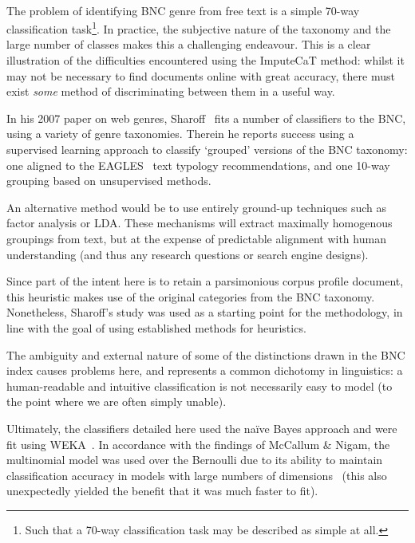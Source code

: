 
\paragraph{}
The problem of identifying BNC genre from free text is a simple 70-way classification task\footnote{Such that a 70-way classification task may be described as simple at all.}.  In practice, the subjective nature of the taxonomy and the large number of classes makes this a challenging endeavour.  This is a clear illustration of the difficulties encountered using the ImputeCaT method: whilst it may not be necessary to find documents online with great accuracy, there must exist \textsl{some} method of discriminating between them in a useful way.



In his 2007 paper on web genres, Sharoff~\cite[p. 5]{sharoff2007classifying} fits a number of classifiers to the BNC, using a variety of genre taxonomies.  Therein he reports success using a supervised learning approach to classify `grouped' versions of the BNC taxonomy: one aligned to the EAGLES~\cite{EagTcwgCtypeaglespreliminary} text typology recommendations, and one 10-way grouping based on unsupervised methods.

An alternative method would be to use entirely ground-up techniques such as factor analysis or LDA.  These mechanisms will extract maximally homogenous groupings from text, but at the expense of predictable alignment with human understanding (and thus any research questions or search engine designs).

Since part of the intent here is to retain a parsimonious corpus profile document, this heuristic makes use of the original categories from the BNC taxonomy.  Nonetheless, Sharoff's study was used as a starting point for the methodology, in line with the goal of using established methods for heuristics.

The ambiguity and external nature of some of the distinctions drawn in the BNC index causes problems here, and represents a common dichotomy in linguistics: a human-readable and intuitive classification is not necessarily easy to model (to the point where we are often simply unable).

Ultimately, the classifiers detailed here used the na\"ive Bayes approach and were fit using WEKA~\cite{hall2009weka}.  In accordance with the findings of McCallum \& Nigam, the multinomial model was used over the Bernoulli due to its ability to maintain classification accuracy in models with large numbers of dimensions~\cite{mccallum1998comparison} (this also unexpectedly yielded the benefit that it was much faster to fit).

